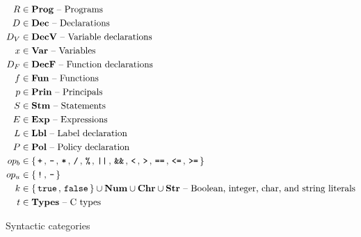\begin{table}[h!]
  \begin{align*}
    R       & \in \mathbf{Prog} \text{ -- Programs}\\
    D       & \in \mathbf{Dec} \text{ -- Declarations}\\
    D_V     & \in \mathbf{DecV} \text{ -- Variable declarations}\\
    x       & \in \mathbf{Var} \text{ -- Variables}\\
    D_F     & \in \mathbf{DecF} \text{ -- Function declarations}\\
    f       & \in \mathbf{Fun} \text{ -- Functions}\\
    p       & \in \mathbf{Prin} \text{ -- Principals}\\
    S       & \in \mathbf{Stm} \text{ -- Statements}\\
    E       & \in \mathbf{Exp} \text{ -- Expressions}\\
    L       & \in \mathbf{Lbl} \text{ -- Label declaration}\\
    P       & \in \mathbf{Pol} \text{ -- Policy declaration}\\
    op_b    & \in \{ \, \texttt{+} \, ,  \, \texttt{-} \, ,  \, \texttt{*} \, ,  \, \texttt{/} \, ,  \, \texttt{\%} \, ,  \, \texttt{||} \, ,  \, \texttt{\&\&} \, ,  \, \texttt{<} \, ,  \, \texttt{>} \, ,  \, \texttt{==} \, ,  \, \texttt{<=} \, ,  \, \texttt{>=} \, \} \\
    op_u    & \in \{ \, \texttt{!} \, ,  \, \texttt{-} \, \} \\
    k       & \in \{ \, \texttt{true} \,, \, \texttt{false} \, \} \cup \mathbf{Num} \cup \mathbf{Chr} \cup \mathbf{Str} \text{ -- Boolean, integer, char, and string literals} \\
    t       & \in \mathbf{Types} \text{ -- C types}
  \end{align*}
  \caption{Syntactic categories}
  \label{ctif:categories}
\end{table}

